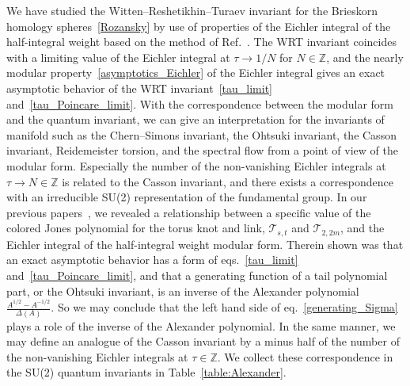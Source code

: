 \documentclass[12pt,reqno]{amsart}
\numberwithin{equation}{section}
\begin{document}
We have studied the Witten--Reshetikhin--Turaev
invariant for the Brieskorn homology spheres~\eqref{Rozansky}
by use of properties of the Eichler integral of the half-integral weight
based on the  method of Ref.~.
The WRT invariant coincides with
a limiting value of the Eichler integral at $\tau\to 1/N$ for $N\in\mathbb{Z}$,
and
the nearly modular property~\eqref{asymptotics_Eichler}
of the Eichler integral gives an exact asymptotic
behavior of the WRT invariant~\eqref{tau_limit} and~\eqref{tau_Poincare_limit}.
With the correspondence between the modular form and the quantum invariant,
we can give an interpretation
for the  invariants of manifold
such as the Chern--Simons invariant,
the Ohtsuki invariant,
the Casson invariant,
Reidemeister torsion, 
and the spectral flow
from a point of view of the modular form.
Especially the number of the non-vanishing Eichler integrals
at $\tau\to N\in\mathbb{Z}$
is related to the Casson invariant, and there
exists a correspondence with an irreducible 
SU(2) representation of the fundamental group.
In our previous papers~\cite{KHikami03c,KHikami03a,KHikami03b},
we revealed a relationship between
a specific value of the colored Jones polynomial for the torus knot and link,
$\mathcal{T}_{s,t}$ and $\mathcal{T}_{2,2 m}$,
and the Eichler integral of the
half-integral weight modular form.
Therein shown was that  an exact asymptotic behavior has a form of eqs.~\eqref{tau_limit} and~\eqref{tau_Poincare_limit},
and that
a generating function of a tail polynomial part,
or the Ohtsuki invariant,
is an inverse of the Alexander polynomial
$\frac{A^{1/2}- A^{-1/2}}{\Delta(A)}$.
So we may conclude that
the left hand side of eq.~\eqref{generating_Sigma} plays a role of the inverse of the Alexander polynomial.
In the same manner, 
we may define
an analogue of the Casson invariant 
by a minus half of  the number of the non-vanishing Eichler integrals at $\tau\in \mathbb{Z}$.
We collect these correspondence
in the SU(2) quantum invariants in Table~\ref{table:Alexander}.
\end{document}
